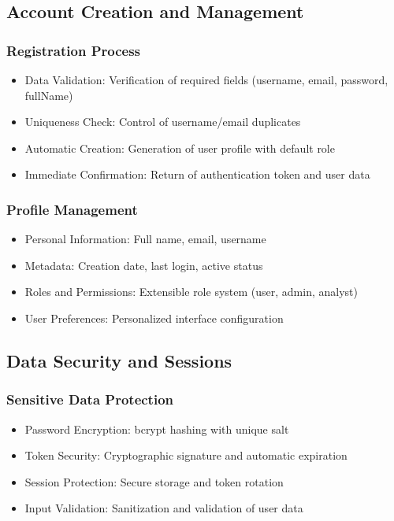 \documentclass[12pt,a4paper]{article}
\begin{document}
\subsection{Account Creation and Management}
\subsubsection{Registration Process}
\begin{itemize}
    \item Data Validation: Verification of required fields (username, email, password, fullName)
    \item Uniqueness Check: Control of username/email duplicates
    \item Automatic Creation: Generation of user profile with default role
    \item Immediate Confirmation: Return of authentication token and user data
\end{itemize}

\subsubsection{Profile Management}
\begin{itemize}
    \item Personal Information: Full name, email, username
    \item Metadata: Creation date, last login, active status
    \item Roles and Permissions: Extensible role system (user, admin, analyst)
    \item User Preferences: Personalized interface configuration
\end{itemize}

\subsection{Data Security and Sessions}
\subsubsection{Sensitive Data Protection}
\begin{itemize}
    \item Password Encryption: bcrypt hashing with unique salt
    \item Token Security: Cryptographic signature and automatic expiration
    \item Session Protection: Secure storage and token rotation
    \item Input Validation: Sanitization and validation of user data
\end{itemize}
\end{document}
